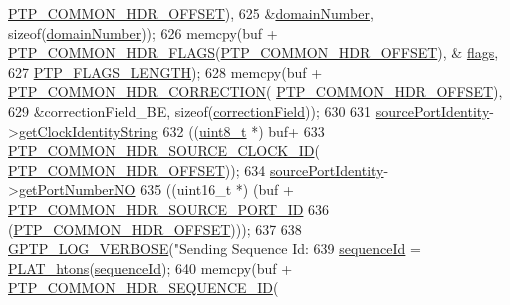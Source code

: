 \begin{DoxyCode}
      \hyperlink{avbts__message_8hpp_a330dd502b6e19949d74c8f3a96dd5667}{PTP\_COMMON\_HDR\_OFFSET}),
625            &\hyperlink{class_p_t_p_message_common_a0443527ff087aecea2cac4f6e84d189c}{domainNumber}, \textcolor{keyword}{sizeof}(\hyperlink{class_p_t_p_message_common_a0443527ff087aecea2cac4f6e84d189c}{domainNumber}));
626     memcpy(buf + \hyperlink{avbts__message_8hpp_a60148b9c4d7f51e723a3ae8dd73e7851}{PTP\_COMMON\_HDR\_FLAGS}(\hyperlink{avbts__message_8hpp_a330dd502b6e19949d74c8f3a96dd5667}{PTP\_COMMON\_HDR\_OFFSET}), &
      \hyperlink{class_p_t_p_message_common_a8c2f6104634deb80d932fa0cd9166fba}{flags},
627            \hyperlink{avbts__message_8hpp_ad8b20c17c21a3024f129fc556d5382c2}{PTP\_FLAGS\_LENGTH});
628     memcpy(buf + \hyperlink{avbts__message_8hpp_a86a729fd44989d68c1ebe5c385839743}{PTP\_COMMON\_HDR\_CORRECTION}(
      \hyperlink{avbts__message_8hpp_a330dd502b6e19949d74c8f3a96dd5667}{PTP\_COMMON\_HDR\_OFFSET}),
629            &correctionField\_BE, \textcolor{keyword}{sizeof}(\hyperlink{class_p_t_p_message_common_a635b707dac6610b5b159be5c8ec1891e}{correctionField}));
630 
631     \hyperlink{class_p_t_p_message_common_a415b5544bdd3ea41dae460fa1af900d9}{sourcePortIdentity}->\hyperlink{class_port_identity_a2047fe8013d08f14ac579d604e2efd7e}{getClockIdentityString}
632       ((\hyperlink{stdint_8h_aba7bc1797add20fe3efdf37ced1182c5}{uint8\_t} *) buf+
633        \hyperlink{avbts__message_8hpp_ac56d471778da7bf419e64ecf2103ad9b}{PTP\_COMMON\_HDR\_SOURCE\_CLOCK\_ID}(
      \hyperlink{avbts__message_8hpp_a330dd502b6e19949d74c8f3a96dd5667}{PTP\_COMMON\_HDR\_OFFSET}));
634     \hyperlink{class_p_t_p_message_common_a415b5544bdd3ea41dae460fa1af900d9}{sourcePortIdentity}->\hyperlink{class_port_identity_ae22242effe1001dc666522e6019fd494}{getPortNumberNO}
635       ((uint16\_t *) (buf + \hyperlink{avbts__message_8hpp_a53a15a915e51af626e90665cbcc6c443}{PTP\_COMMON\_HDR\_SOURCE\_PORT\_ID}
636              (\hyperlink{avbts__message_8hpp_a330dd502b6e19949d74c8f3a96dd5667}{PTP\_COMMON\_HDR\_OFFSET})));
637 
638     \hyperlink{gptp__log_8hpp_add03384a2a8099b27e07d041cce77e6f}{GPTP\_LOG\_VERBOSE}(\textcolor{stringliteral}{"Sending Sequence Id: %
639     \hyperlink{class_p_t_p_message_common_a189710d5cff10c03f77d72a276a5f58e}{sequenceId} = \hyperlink{linux_2src_2platform_8cpp_aa89fc0aa7465274c200da69771d2a043}{PLAT\_htons}(\hyperlink{class_p_t_p_message_common_a189710d5cff10c03f77d72a276a5f58e}{sequenceId});
640     memcpy(buf + \hyperlink{avbts__message_8hpp_af717ee08477f9388e66fc5451971e6af}{PTP\_COMMON\_HDR\_SEQUENCE\_ID}(
}
\end{DoxyCode}
